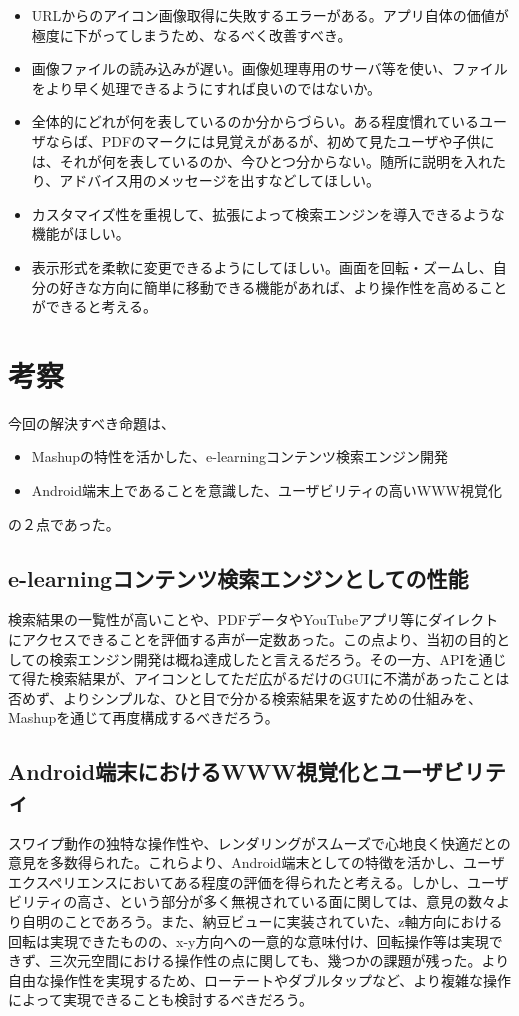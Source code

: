 \begin{itemize}
\item URLからのアイコン画像取得に失敗するエラーがある。アプリ自体の価値が極度に下がってしまうため、なるべく改善すべき。
\item 画像ファイルの読み込みが遅い。画像処理専用のサーバ等を使い、ファイルをより早く処理できるようにすれば良いのではないか。
\item 全体的にどれが何を表しているのか分からづらい。ある程度慣れているユーザならば、PDFのマークには見覚えがあるが、初めて見たユーザや子供には、それが何を表しているのか、今ひとつ分からない。随所に説明を入れたり、アドバイス用のメッセージを出すなどしてほしい。
\item カスタマイズ性を重視して、拡張によって検索エンジンを導入できるような機能がほしい。
\item 表示形式を柔軟に変更できるようにしてほしい。画面を回転・ズームし、自分の好きな方向に簡単に移動できる機能があれば、より操作性を高めることができると考える。
\end{itemize}

\section{考察}
今回の解決すべき命題は、
\begin{itemize}
\item Mashupの特性を活かした、e-learningコンテンツ検索エンジン開発
\item Android端末上であることを意識した、ユーザビリティの高いWWW視覚化
\end{itemize}
の２点であった。

\subsection{e-learningコンテンツ検索エンジンとしての性能}
検索結果の一覧性が高いことや、PDFデータやYouTubeアプリ等にダイレクトにアクセスできることを評価する声が一定数あった。この点より、当初の目的としての検索エンジン開発は概ね達成したと言えるだろう。その一方、APIを通じて得た検索結果が、アイコンとしてただ広がるだけのGUIに不満があったことは否めず、よりシンプルな、ひと目で分かる検索結果を返すための仕組みを、Mashupを通じて再度構成するべきだろう。

\subsection{Android端末におけるWWW視覚化とユーザビリティ}
スワイプ動作の独特な操作性や、レンダリングがスムーズで心地良く快適だとの意見を多数得られた。これらより、Android端末としての特徴を活かし、ユーザエクスペリエンスにおいてある程度の評価を得られたと考える。しかし、ユーザビリティの高さ、という部分が多く無視されている面に関しては、意見の数々より自明のことであろう。また、納豆ビュー\cite{natto}に実装されていた、z軸方向における回転は実現できたものの、x-y方向への一意的な意味付け、回転操作等は実現できず、三次元空間における操作性の点に関しても、幾つかの課題が残った。より自由な操作性を実現するため、ローテートやダブルタップなど、より複雑な操作によって実現できることも検討するべきだろう。